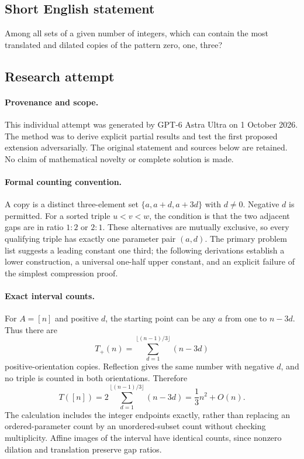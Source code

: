 \documentclass[11pt,a4paper]{article}
\begin{document}
\subsection{Short English statement}

Among all sets of a given number of integers, which can contain the most translated and dilated copies of the pattern zero, one, three?

\subsection{Research attempt}

\paragraph{Provenance and scope.}
This individual attempt was generated by GPT-6 Astra Ultra on 1 October 2026. The method was to derive explicit partial results and test the first proposed extension adversarially. The original statement and sources below are retained. No claim of mathematical novelty or complete solution is made.

\paragraph{Formal counting convention.}
A copy is a distinct three-element set $\{a,a+d,a+3d\}$ with $d\ne0$. Negative $d$ is permitted. For a sorted triple $u<v<w$, the condition is that the two adjacent gaps are in ratio $1:2$ or $2:1$. These alternatives are mutually exclusive, so every qualifying triple has exactly one parameter pair $(a,d)$. The primary problem list suggests a leading constant one third; the following derivations establish a lower construction, a universal one-half upper constant, and an explicit failure of the simplest compression proof.

\paragraph{Exact interval counts.}
For $A=[n]$ and positive $d$, the starting point can be any $a$ from one to $n-3d$. Thus there are
\[
 T_+(n)=\sum_{d=1}^{\lfloor(n-1)/3\rfloor}(n-3d)
\]
positive-orientation copies. Reflection gives the same number with negative $d$, and no triple is counted in both orientations. Therefore
\[
 T([n])=2\sum_{d=1}^{\lfloor(n-1)/3\rfloor}(n-3d)
       =\frac13n^2+O(n).
\]
The calculation includes the integer endpoints exactly, rather than replacing an ordered-parameter count by an unordered-subset count without checking multiplicity. Affine images of the interval have identical counts, since nonzero dilation and translation preserve gap ratios.
\end{document}
